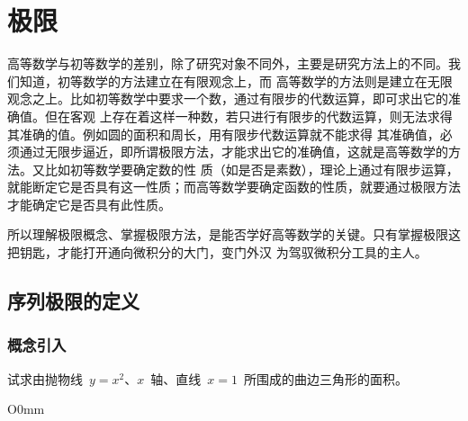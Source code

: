 

\chapter{极\emspace 限}\label{ch:2}

高等数学与初等数学的差别，除了研究对象不同外，主要是研究方法上的不同。我们知道，初等数学的方法建立在有限观念上，而
高等数学的方法则是建立在无限观念之上。比如初等数学中要求一个数，通过有限步的代数运算，即可求出它的准确值。但在客观
上存在着这样一种数，若只进行有限步的代数运算，则无法求得其准确的值。例如圆的面积和周长，用有限步代数运算就不能求得
其准确值，必须通过无限步逼近，即所谓极限方法，才能求出它的准确值，这就是高等数学的方法。又比如初等数学要确定数的性
质（如是否是素数），理论上通过有限步运算，就能断定它是否具有这一性质；而高等数学要确定函数的性质，就要通过极限方法
才能确定它是否具有此性质。

所以理解极限概念、掌握极限方法，是能否学好高等数学的关键。只有掌握极限这把钥匙，才能打开通向微积分的大门，变门外汉
为驾驭微积分工具的主人。


\section{序列极限的定义}

\subsection{概念引入}

试求由抛物线~$y=x^2$、$x$~轴、直线~$x=1$~所围成的曲边三角形的面积。

\begin{wrapfigure}[9]{O}{0mm}
\somefigure
\caption{}\label{fig:sec2.1-1}
\end{wrapfigure}

